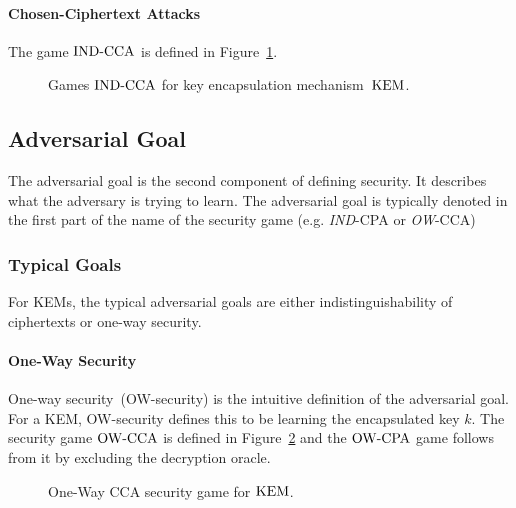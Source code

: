 \paragraph{Chosen-Ciphertext Attacks}
The game ${\mathrm{IND}\text{-}\mathrm{CCA}}$ is defined in Figure~\ref{fig:kem:ind}.

\begin{figure}[!ht]
    \centering
    \nicoresetlinenr%
    \fbox{%
        \scalebox{\codescalefactor}{%
        }%
    }
    \caption{%
        Games ${\mathrm{IND}\text{-}\mathrm{CCA}}$ for key encapsulation mechanism~$\mathrm{KEM}$.
    }
    \label{fig:kem:ind}
\end{figure}


\subsection{Adversarial Goal}
The adversarial goal is the second component of defining security.
It describes what the adversary is trying to learn. 
The adversarial goal is typically denoted in the first part of the name of the security game (e.g. \emph{IND}-CPA or \emph{OW}-CCA)

\subsubsection{Typical Goals}
For KEMs, the typical adversarial goals are either indistinguishability of ciphertexts or one-way security.

\paragraph{One-Way Security}
One-way security~(OW-security) is the intuitive definition of the adversarial goal. 
For a KEM, OW-security defines this to be learning the encapsulated key $k$.
The security game ${\mathrm{OW}\text{-}\mathrm{CCA}}$ is defined in Figure~\ref{fig:kem:ow:cca} and the ${\mathrm{OW}\text{-}\mathrm{CPA}}$ game follows from it by excluding the decryption oracle.

\begin{figure}[!ht]
    \centering
    \nicoresetlinenr%
    \fbox{%
        \scalebox{\codescalefactor}{%
        }%
    }
    \caption{%
        One-Way CCA security game for $\mathrm{KEM}$.
    }
    \label{fig:kem:ow:cca}
\end{figure}

